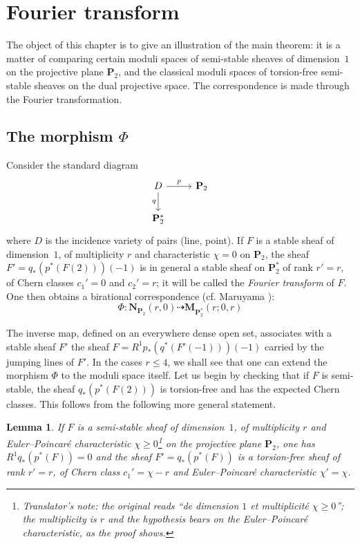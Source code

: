 \documentclass[12pt,english]{smfart}%
\theoremstyle{plain}
\newtheorem{lemma}[theorem]{Lemma}
\theoremstyle{definition}
\theoremstyle{remark}
\newcommand{\PP}{\mathbf{P}}
\newcommand{\origpage}[1]{\marginnote{\scriptsize\itshape p.~#1}}
\newcommand{\tnote}[1]{\footnote{\emph{Translator's note}: #1}}
\begin{document}
\section{Fourier transform}\label{sec:fourier}

The object of this chapter is to give an illustration of the main theorem: it is a matter of comparing certain moduli spaces of semi-stable sheaves of dimension~$1$ on the projective plane $\PP_{2}$, and the classical moduli spaces of torsion-free semi-stable sheaves on the dual projective space. The correspondence is made through the Fourier transformation.

\subsection{The morphism \texorpdfstring{$\Phi$}{Phi}}\label{subsec:Phi}

Consider the standard diagram
\[
\begin{tikzcd}
D \arrow[r,"p"] \arrow[d,"q"'] & \PP_{2} \\
\PP_{2}^{*} &
\end{tikzcd}
\]
\origpage{657}%
where $D$ is the incidence variety of pairs (line, point). If $F$ is a stable sheaf of dimension~$1$, of multiplicity $r$ and characteristic $\chi=0$ on $\PP_{2}$, the sheaf $F'=q_{*}(p^{*}(F(2)))(-1)$ is in general a stable sheaf on $\PP_{2}^{*}$ of rank $r'=r$, of Chern classes $c_{1}'=0$ and $c_{2}'=r$; it will be called the \emph{Fourier transform} of $F$. One then obtains a birational correspondence (cf. Maruyama \cite{Mar}):
\[
\Phi : \mathbf{N}_{\PP_{2}}(r,0) \dashrightarrow \mathbf{M}_{\PP_{2}^{*}}(r;0,r)
\]

The inverse map, defined on an everywhere dense open set, associates with a stable sheaf $F'$ the sheaf $F=R^{1}p_{*}(q^{*}(F'(-1)))(-1)$ carried by the jumping lines of $F'$. In the cases $r\leq 4$, we shall see that one can extend the morphism $\Phi$ to the moduli space itself. Let us begin by checking that if $F$ is semi-stable, the sheaf $q_{*}(p^{*}(F(2)))$ is torsion-free and has the expected Chern classes. This follows from the following more general statement.

\begin{lemma}\label{lem:direct-image}
If $F$ is a semi-stable sheaf of dimension~$1$, of multiplicity $r$ and Euler--Poincar\'e characteristic $\chi\geq 0$\tnote{the original reads ``de dimension $1$ et multiplicit\'e $\chi\geq 0$''; the multiplicity is $r$ and the hypothesis bears on the Euler--Poincar\'e characteristic, as the proof shows.} on the projective plane $\PP_{2}$, one has $R^{1}q_{*}(p^{*}(F))=0$ and the sheaf $F'=q_{*}(p^{*}(F))$ is a torsion-free sheaf of rank $r'=r$, of Chern class $c_{1}'=\chi-r$ and Euler--Poincar\'e characteristic $\chi'=\chi$.
\end{lemma}
\end{document}
